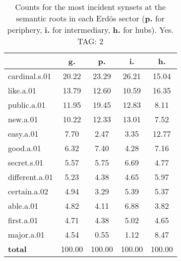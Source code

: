 \begin{table}[h!]
\begin{center}
\begin{tabular}{| l || c | c | c | c |}\hline
 & {\bf g.} & {\bf p.} & {\bf i.} & {\bf h.} \\\hline\hline
cardinal.s.01 & 20.22  & 23.29  & 26.21  & 15.04 \\\hline
like.a.01 & 13.79  & 12.60  & 10.59  & 16.35 \\\hline
public.a.01 & 11.95  & 19.45  & 12.83  & 8.11 \\\hline
new.a.01 & 10.22  & 12.33  & 13.01  & 7.52 \\\hline
easy.a.01 & 7.70  & 2.47  & 3.35  & 12.77 \\\hline
good.a.01 & 6.32  & 7.40  & 4.28  & 7.16 \\\hline
secret.s.01 & 5.57  & 5.75  & 6.69  & 4.77 \\\hline
different.a.01 & 5.23  & 4.38  & 4.65  & 5.97 \\\hline
certain.a.02 & 4.94  & 3.29  & 5.39  & 5.37 \\\hline
able.a.01 & 4.82  & 4.11  & 6.88  & 3.82 \\\hline
first.a.01 & 4.71  & 4.38  & 5.02  & 4.65 \\\hline
major.a.01 & 4.54  & 0.55  & 1.12  & 8.47 \\\hline\hline
{{\bf total}} & 100.00  & 100.00  & 100.00  & 100.00 \\\hline
\end{tabular}
\caption{Counts for the most incident synsets at the semantic roots in each Erd\"os sector ({\bf p.} for periphery, {\bf i.} for intermediary, {\bf h.} for hubs). Yes. TAG: 2}
\end{center}
\end{table}